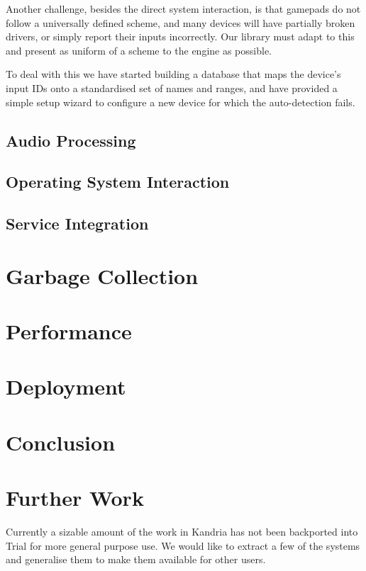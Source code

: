 \documentclass[format=sigconf]{acmart}
\begin{document}
Another challenge, besides the direct system interaction, is that gamepads do not follow a universally defined scheme, and many devices will have partially broken drivers, or simply report their inputs incorrectly. Our library must adapt to this and present as uniform of a scheme to the engine as possible.

To deal with this we have started building a database that maps the device's input IDs onto a standardised set of names and ranges, and have provided a simple setup wizard to configure a new device for which the auto-detection fails.

\subsection{Audio Processing}\label{audio}

\subsection{Operating System Interaction}\label{os}

\subsection{Service Integration}\label{steam}

\section{Garbage Collection}\label{gc}


\section{Performance}\label{performance}


\section{Deployment}\label{deployment}


\section{Conclusion}\label{conclusion}


\section{Further Work}\label{further-work}
Currently a sizable amount of the work in Kandria has not been backported into Trial for more general purpose use. We would like to extract a few of the systems and generalise them to make them available for other users.
\end{document}
